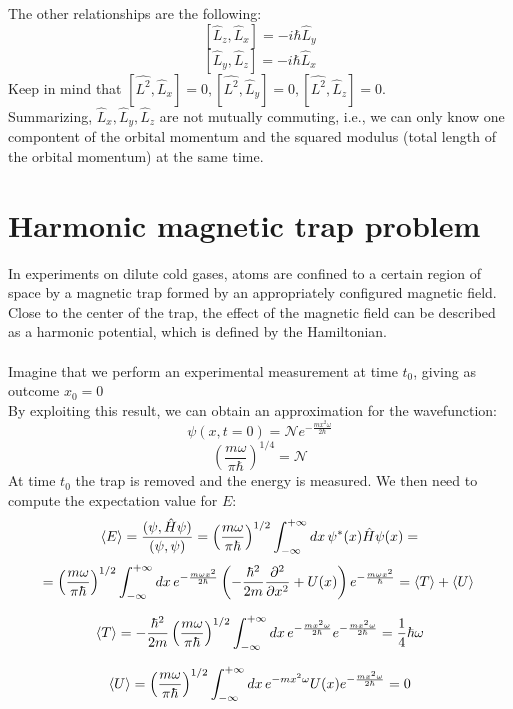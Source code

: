\noindent
The other relationships are the following:
$$\left[\hat{L}_{z}, \hat{L}_{x}\right]=-i \hbar \hat{L}_{y}$$
$$\left[\hat{L}_{y}, \hat{L}_{z}\right]=-i \hbar \hat{L}_{x}$$
Keep in mind that $[\hat{L^2}, \hat{L}_{x}]=0,[\hat{L^2}, \hat{L}_{y}]=0,[\hat{L^2}, \hat{L}_{z}]=0$.\\
\noindent
Summarizing,  $\hat{L}_{x},\hat{L}_{y},\hat{L}_{z}$ are not mutually commuting, i.e., we can only know one compontent of the orbital momentum and the squared modulus (total length of the orbital momentum) at the same time.

\section{Harmonic magnetic trap problem}
In experiments on dilute cold gases, atoms are confined to a certain region of space by a magnetic trap formed by an appropriately configured magnetic field.
Close to the center of the trap, the effect of the magnetic field can be described as a harmonic potential, which is defined by the Hamiltonian.\\
\\
Imagine that we perform an experimental measurement at time $t_0$, giving as outcome $x_{0}=0$ \\
By exploiting this result, we can obtain an approximation for the wavefunction:
$$\psi(x,t=0)= \mathcal{N} e^{-\frac{m x^{2} \omega}{2 \hbar}}$$
$$
\left(\frac{m \omega}{ \pi \hbar}\right)^{1 / 4}=\mathcal{N}
$$
\noindent
At time $t_0$ the trap is removed and the energy is measured.
We then need to compute the expectation value for $E$:
$$\expval{E} =\frac{(\psi, \hat{H} \psi)}{(\psi, \psi)}=\left(\frac{m \omega}{ \pi \hbar}\right)^{1 / 2} \int_{-\infty}^{+\infty}d x\, \psi^{*}(x) \hat{H} \psi(x)=$$
$$ =\left(\frac{m \omega}{ \pi \hbar}\right)^{1 / 2} \int_{-\infty}^{+\infty} d x\,e^{-\frac{m \omega x^{2}}{2 \hbar}}\left(-\frac{\hbar^{2}}{2 m} \frac{\partial^{2}}{\partial x^{2}}+U(x)\right) e^{-\frac{m \omega x^{2}}{ \hbar}}=
\expval{T}+\expval{U}\\$$

$$\expval{T} =-\frac{\hbar^{2}}{2 m}\left(\frac{m \omega}{\pi \hbar}\right)^{1 / 2} \int_{-\infty}^{+\infty} d x\, e^{-\frac{m x^{2} \omega}{2 \hbar}} e^{-\frac{m x^{2} \omega}{2 \hbar}}=\frac{1}{4} \hbar \omega$$

$$\expval{U} =\left(\frac{m \omega}{\pi \hbar}\right)^{1 / 2} \int_{-\infty}^{+\infty} d x\, e^{-m x^{2} \omega} U(x) e^{-\frac{m x^{2} \omega}{2 \hbar}}=0$$

